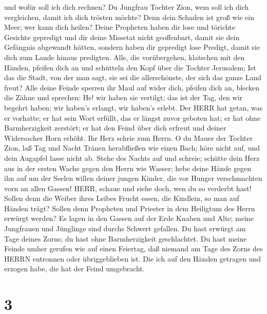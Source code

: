 und wofür soll ich dich rechnen? Du Jungfrau Tochter Zion, wem soll ich
dich vergleichen, damit ich dich trösten möchte? Denn dein Schaden ist
groß wie ein Meer; wer kann dich heilen?  Deine Propheten
haben dir lose und törichte Gesichte gepredigt und dir deine Missetat
nicht geoffenbart, damit sie dein Gefängnis abgewandt hätten, sondern
haben dir gepredigt lose Predigt, damit sie dich zum Lande hinaus
predigten.  Alle, die vorübergehen, klatschen mit den
Händen, pfeifen dich an und schütteln den Kopf über die Tochter
Jerusalem; Ist das die Stadt, von der man sagt, sie sei die
allerschönste, der sich das ganze Land freut?  Alle deine
Feinde sperren ihr Maul auf wider dich, pfeifen dich an, blecken die
Zähne und sprechen: He! wir haben sie vertilgt; das ist der Tag, den wir
begehrt haben; wir haben's erlangt, wir haben's erlebt. 
Der HERR hat getan, was er vorhatte; er hat sein Wort erfüllt, das er
längst zuvor geboten hat; er hat ohne Barmherzigkeit zerstört; er hat
den Feind über dich erfreut und deiner Widersacher Horn erhöht.
 Ihr Herz schrie zum Herrn. O du Mauer der Tochter Zion,
laß Tag und Nacht Tränen herabfließen wie einen Bach; höre nicht auf,
und dein Augapfel lasse nicht ab.  Stehe des Nachts auf und
schreie; schütte dein Herz aus in der ersten Wache gegen den Herrn wie
Wasser; hebe deine Hände gegen ihn auf um der Seelen willen deiner
jungen Kinder, die vor Hunger verschmachten vorn an allen Gassen!
 HERR, schaue und siehe doch, wen du so verderbt hast!
Sollen denn die Weiber ihres Leibes Frucht essen, die Kindlein, so man
auf Händen trägt? Sollen denn Propheten und Priester in dem Heiligtum
des Herrn erwürgt werden?  Es lagen in den Gassen auf der
Erde Knaben und Alte; meine Jungfrauen und Jünglinge sind durchs Schwert
gefallen. Du hast erwürgt am Tage deines Zorns; du hast ohne
Barmherzigkeit geschlachtet.  Du hast meine Feinde umher
gerufen wie auf einen Feiertag, daß niemand am Tage des Zorns des HERRN
entronnen oder übriggeblieben ist. Die ich auf den Händen getragen und
erzogen habe, die hat der Feind umgebracht.

\hypertarget{section-2}{%
\section{3}\label{section-2}}

